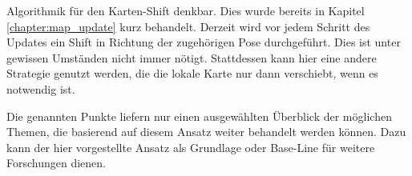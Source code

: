 Algorithmik für den Karten-Shift denkbar. Dies wurde bereits in Kapitel \ref{chapter:map_update} kurz behandelt. Derzeit wird vor jedem Schritt des Updates ein Shift in Richtung der zugehörigen Pose durchgeführt. Dies ist unter gewissen Umständen nicht immer nötigt. Stattdessen kann hier eine andere Strategie genutzt werden, die die lokale Karte nur dann verschiebt, wenn es notwendig ist.

Die genannten Punkte liefern nur einen ausgewählten Überblick der möglichen Themen, die basierend auf diesem Ansatz weiter behandelt werden können. Dazu kann der hier vorgestellte Ansatz als Grundlage oder Base-Line für weitere Forschungen dienen.
